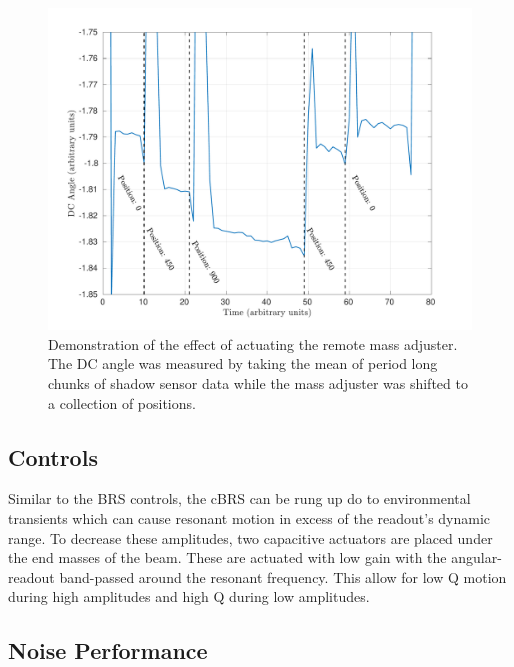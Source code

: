 \documentclass [12pt, proquest]{uwthesis}[2019]
\begin{document}
\begin{figure}[!h]
\begin{center}
\includegraphics[width=\textwidth]{cBRS_massAdjust.pdf}
\end{center}
\caption[Demonstration of the effect of actuating the remote mass adjuster]{Demonstration of the effect of actuating the remote mass adjuster. The DC angle was measured by taking the mean of period long chunks of shadow sensor data while the mass adjuster was shifted to a collection of positions.}\label{massAdjustPlot}
\end{figure}

\subsection{Controls}

Similar to the BRS controls, the cBRS can be rung up do to environmental transients which can cause resonant motion in excess of the readout's dynamic range. To decrease these amplitudes, two capacitive actuators are placed under the end masses of the beam. These are actuated with low gain with the angular-readout band-passed around the resonant frequency. This allow for low Q motion during high amplitudes and high Q during low amplitudes.

\subsection{Noise Performance}
\end{document}
